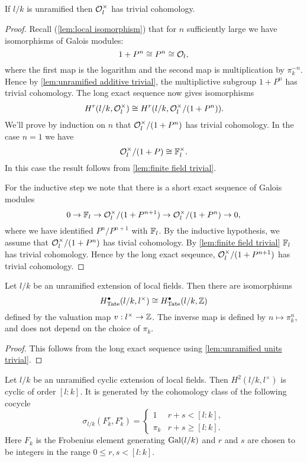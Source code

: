 \begin{lemma}	\label{lem:unramified units trivial}
	If $l/k$ is unramified then ${\mathcal O}_l^\times$ has trivial cohomology.
\end{lemma}

\begin{proof}
	Recall (\ref{lem:local isomorphism}) that for $n$ sufficiently large we have isomorphisms of
	Galois modules:
	\[
		1 + P^n \cong P^n \cong {\mathcal O}_l,
	\]
	where the first map is the logarithm and the second map is multiplication by $\pi_k^{-n}$.
	Hence by \ref{lem:unramified additive trivial}, the multiplictive subgroup $1+P^n$ has trivial
	cohomology.
	The long exact sequence now gives isomorphisms
	\[
		H^r(l/k,{\mathcal O}_l^\times) \cong H^r(l/k,{\mathcal O}_l^\times / (1+P^n)).
	\]
	We'll prove by induction on $n$ that ${\mathcal O}_l^\times / (1+P^n)$ has trivial cohomology.
	In the case $n = 1$ we have
	\[
		{\mathcal O}_l^\times / (1+P) \cong {\mathbb F}_l^\times.
	\]
	In this case the result follows from \ref{lem:finite field trivial}.

	For the inductive step we note that there is a short exact sequence of Galois modules
	\[
		0 \to {\mathbb F}_l \to  {\mathcal O}_l^\times / (1+P^{n+1})  \to{\mathcal O}_l^\times / (1+P^n)  \to  0,
	\]
	where we have identified $P^n / P^{n+1}$ with ${\mathbb F}_l$.
	By the inductive hypothesis, we assume that ${\mathcal O}_l^\times / (1+P^n)$ has tivial cohomology.
	By \ref{lem:finite field trivial} ${\mathbb F}_l$ has trivial cohomology.
	Hence by the long exact seqeunce, ${\mathcal O}_l^\times / (1+P^{n+1})$ has trivial cohomology.
\end{proof}


\begin{corollary}
	Let $l/k$ be an unramified extension of local fields.
	Then there are isomorphisms
	\[
		H^\bullet_{\mathrm{Tate}}(l/k,l^\times) \cong H^\bullet_{\mathrm{Tate}} (l/k,{\mathbb Z})
	\]
	defined by the valuation map $v : l^\times \to {\mathbb Z}$.
	The inverse map is defined by $n \mapsto \pi_k^n$, and does not depend on the choice of $\pi_k$.
\end{corollary}

\begin{proof}
	This follows from the long exact sequence using \ref{lem:unramified units trivial}.
\end{proof}


\begin{lemma} \label{lem:unrammified fundamental class}
	Let $l/k$ be an unramified cyclic extension of local fields.
	Then $H^2(l/k,l^\times)$ is cyclic of order $[l:k]$.
	It is generated by the cohomology class of the following cocycle
	\[
		\sigma_{l/k} (F_k^r, F_k^s) =
		\begin{cases}
			1 & r + s < [l:k], \\
			\pi_k & r + s \ge [l:k].
		\end{cases}
	\]
	Here $F_k$ is the Frobenius element generating $\mathrm{Gal}(l/k)$ and $r$ and $s$
	are chosen to be integers in the range $0 \le r,s <[l:k]$.
\end{lemma}

